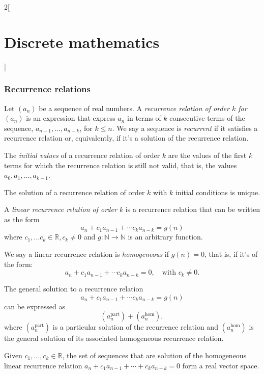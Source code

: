 \documentclass[class=article,10pt,crop=false]{standalone}
\begin{document}
\begin{multicols}{2}[\section{Discrete mathematics}]
\subsubsection*{Recurrence relations}
\begin{definition}
Let $(a_n)$ be a sequence of real numbers. A \textit{recurrence relation of order $k$ for $(a_n)$} is an expression that express $a_n$ in terms of $k$ consecutive terms of the sequence, $a_{n-1},\ldots,a_{n-k}$, for $k\leq n$. We say a sequence is \textit{recurrent} if it satisfies a recurrence relation or, equivalently, if it's a solution of the recurrence relation.
\end{definition}
\begin{definition}
The \textit{initial values} of a recurrence relation of order $k$ are the values of the first $k$ terms for which the recurrence relation is still not valid, that is, the values $a_0,a_1,\ldots,a_{k-1}$.
\end{definition}
\begin{lemma}
The solution of a recurrence relation of order $k$ with $k$ initial conditions is unique.
\end{lemma}
\begin{definition}
A \textit{linear recurrence relation of order $k$} is a recurrence relation that can be written as the form $$a_n+c_1a_{n-1}+\cdots c_ka_{n-k}=g(n)$$ where $c_1,\ldots c_k\in\mathbb{R}, c_k\ne 0$ and $g:\mathbb{N}\rightarrow\mathbb{N}$ is an arbitrary function.
\end{definition}
\begin{definition}
We say a linear recurrence relation is \textit{homogeneous} if $g(n)=0$, that is, if it's of the form: $$a_n+c_1a_{n-1}+\cdots c_ka_{n-k}=0,\quad\text{with }c_k\ne 0.$$
\end{definition}
\begin{prop}
The general solution to a recurrence relation $$a_n+c_1a_{n-1}+\cdots c_ka_{n-k}=g(n)$$ can be expressed as $$(a_n^\text{part})+(a_n^\text{hom}),$$ where $(a_n^\text{part})$ is a particular solution of the recurrence relation and $(a_n^\text{hom})$ is the general solution of its associated homogeneous recurrence relation.
\end{prop}
\begin{prop}
Given $c_1,\ldots,c_k\in\mathbb{R}$, the set of sequences that are solution of the homogeneous linear recurrence relation $a_n+c_1a_{n-1}+\cdots+c_ka_{n-k}=0$ form a real vector space.
\end{prop}
\begin{definition}

\end{definition}
\end{multicols}
\end{document}
